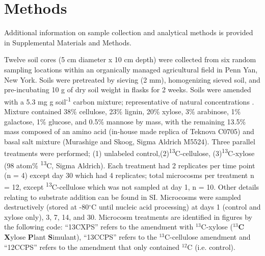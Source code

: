 \section{Methods}
Additional information on sample collection and analytical methods is provided
in Supplemental Materials and Methods.

Twelve soil cores (5 cm diameter x 10 cm depth) were collected from six random
sampling locations within an organically managed agricultural field in Penn
Yan, New York. Soils were pretreated by sieving (2 mm), homogenizing sieved
soil, and pre-incubating 10 g of dry soil weight in flasks for 2 weeks. Soils
were amended with a 5.3 mg g soil\textsuperscript{-1} carbon mixture;
representative of natural concentrations \cite{Schneckenberger_2008}. Mixture
contained 38\% cellulose, 23\% lignin, 20\% xylose, 3\% arabinose, 1\%
galactose, 1\% glucose, and 0.5\% mannose by mass, with the remaining 13.5\%
mass composed of an amino acid (in-house made replica of Teknova C0705) and
basal salt mixture (Murashige and Skoog, Sigma Aldrich M5524). Three parallel
treatments were performed; (1) unlabeled
control,(2)\textsuperscript{13}C-cellulose, (3)\textsuperscript{13}C-xylose (98
atom\% \textsuperscript{13}C, Sigma Aldrich). Each treatment had 2 replicates
per time point (n = 4) except day 30 which had 4 replicates; total microcosms
per treatment n = 12, except \textsuperscript{13}C-cellulose which was not
sampled at day 1, n = 10. Other details relating to substrate addition can be
found in SI. Microcosms were sampled destructively (stored at -80$^{\circ}$C
until nucleic acid processing) at days 1 (control and xylose only), 3, 7,
14, and 30. Microcosm treatments are identified in figures by the
following code: ``13CXPS'' refers to the amendment with $^{13}$C-xylose
($^{13}$\textbf{C} \textbf{X}ylose \textbf{P}lant \textbf{S}imulant),
``13CCPS'' refers to the $^{13}$C-cellulose amendment and ``12CCPS''
refers to the amendment that only contained $^{12}$C (i.e. control).

